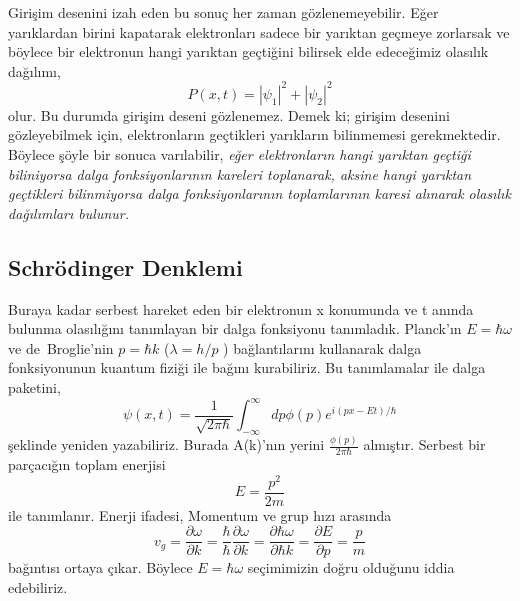\documentclass[00_kitap.tex]{subfiles}
\begin{document}
Girişim desenini izah eden bu sonuç her zaman gözlenemeyebilir. Eğer yarıklardan birini kapatarak elektronları sadece bir yarıktan geçmeye zorlarsak ve böylece bir elektronun hangi yarıktan geçtiğini bilirsek elde edeceğimiz olasılık dağılımı,
\begin{equation}
P(x,t) = |\psi_1 |^2 + |\psi_2|^2
\label{eq:classical_probability}
\end{equation}
olur. Bu durumda girişim deseni gözlenemez. Demek ki; girişim desenini gözleyebilmek için, elektronların geçtikleri yarıkların bilinmemesi gerekmektedir. Böylece şöyle bir sonuca varılabilir, \emph{eğer elektronların hangi yarıktan geçtiği biliniyorsa dalga fonksiyonlarının kareleri toplanarak, aksine hangi yarıktan geçtikleri bilinmiyorsa dalga fonksiyonlarının toplamlarının karesi alınarak olasılık dağılımları bulunur.}


\subsection{Schrödinger Denklemi}

Buraya kadar serbest hareket eden bir elektronun x konumunda ve t anında bulunma olasılığını tanımlayan bir dalga fonksiyonu tanımladık. Planck'ın $E=\hbar\omega$  ve de~Broglie'nin $p=\hbar k$  ($\lambda = h/p$ )  bağlantılarını kullanarak  dalga fonksiyonunun kuantum fiziği ile bağını kurabiliriz.  Bu tanımlamalar ile dalga paketini,
\begin{equation}
\psi \left( x,t\right) =\dfrac {1}{\sqrt {2\pi \hbar }}\int ^{\infty }_{-\infty }dp\phi \left( p\right) e^{i\left( px-Et\right) /\hbar }
\label{eq:wave_packet_in_p}
\end{equation}
şeklinde yeniden yazabiliriz.  Burada A(k)'nın  yerini $\frac{\phi(p)}{2\pi\hbar}$  almıştır.  Serbest bir parçacığın toplam enerjisi
\begin{equation}
E=\dfrac {p^{2}}{2m}
\label{eq:free_particle_E}
\end{equation}
ile tanımlanır.  Enerji ifadesi,  Momentum ve grup hızı arasında
\begin{equation*}
v_{g}=\dfrac {\partial \omega }{\partial k}=\dfrac {\hbar }{\hbar }\dfrac {\partial \omega }{\partial k}=\dfrac {\partial\hbar \omega }{\partial \hbar k}=\dfrac {\partial E}{\partial p}=\dfrac {p}{m}
\end{equation*}
bağıntısı ortaya çıkar.  Böylece $E=\hbar \omega$ seçimimizin doğru olduğunu iddia edebiliriz. 
\end{document}
